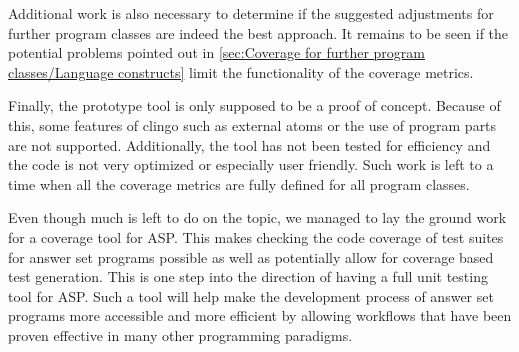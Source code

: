 Additional work is also necessary to determine if the suggested adjustments for further program classes are indeed the best approach. It remains to be seen if the potential problems pointed out in \cref{sec:Coverage for further program classes/Language constructs} limit the functionality of the coverage metrics.

Finally, the prototype tool is only supposed to be a proof of concept. Because of this, some features of clingo such as external atoms or the use of program parts are not supported. Additionally, the tool has not been tested for efficiency and the code is not very optimized or especially user friendly. Such work is left to a time when all the coverage metrics are fully defined for all program classes.

Even though much is left to do on the topic, we managed to lay the ground work for a coverage tool for ASP. This makes checking the code coverage of test suites for answer set programs possible as well as potentially allow for coverage based test generation. This is one step into the direction of having a full unit testing tool for ASP. Such a tool will help make the development process of answer set programs more accessible and more efficient by allowing workflows that have been proven effective in many other programming paradigms.


